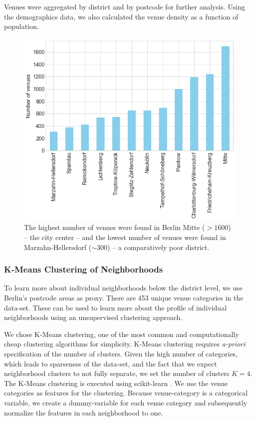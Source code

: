 \documentclass[letter]{scrartcl}
\begin{document}
Venues were aggregated by district and by postcode for further analysis. Using the demographics data, we also calculated the venue density as a function of population.  

\begin{figure}[h!]
\centering
\includegraphics[width=12cm]{../Figures/VenueNumber.PNG}
\caption{The highest number of venues were found in Berlin Mitte ($> 1600$) -- the city center --  and the lowest number of venues were found in Marzahn-Hellersdorf ($\sim 300$) -- a comparatively poor district.}\label{fig:VenNo}
\end{figure}

\subsubsection{K-Means Clustering of Neighborhoods}

To learn more about individual neighborhoods below the district level, we use Berlin's postcode areas as proxy. There are 453 unique venue categories in the data-set. These can be used to learn more about the profile of individual neighborhoods using an unsupervised clustering approach. 

We chose K-Means clustering, one of the most common and computationally cheap clustering algorithms for simplicity. K-Means clustering requires \emph{a-priori} specification of the number of clusters. Given the high number of categories, which leads to sparseness of the data-set, and the fact that we expect neighborhood clusters to not fully separate, we set the number of clusters $K=4$. The K-Means clustering is executed using scikit-learn \cite{sklearn}. We use the venue categories as features for the clustering. Because venue-category is a categorical variable, we create a dummy-variable for each venue category and subsequently normalize the features in each neighborhood to one. 
\end{document}
